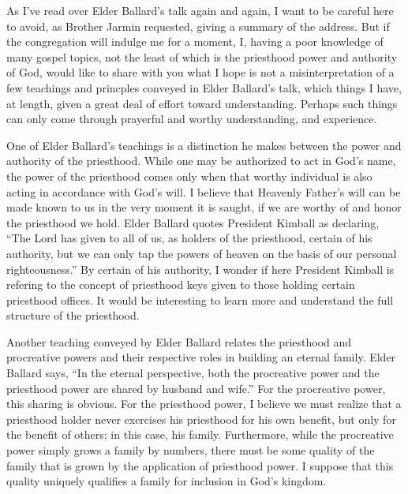 \documentclass[12pt]{article}
\begin{document}
As I've read over Elder Ballard's talk again and again, I want to be careful here to
avoid, as Brother Jarmin requested, giving a summary of the address.  But if the
congregation will indulge me for a moment, I, having a
poor knowledge of many gospel topics, not the least of which is the priesthood
power and authority of God, would like to share with you what I hope is not
a misinterpretation of a few teachings and princples conveyed in Elder Ballard's talk,
which things I have, at length, given a great deal of effort toward understanding.
Perhaps such things can only come through prayerful and worthy understanding,
and experience.

One of Elder Ballard's teachings is a distinction he makes between the power and
authority of the priesthood.  While one may be authorized to act in God's name,
the power of the priesthood comes only when that worthy individual is also acting in
accordance with God's will.  I believe that Heavenly Father's will can be made known
to us in the very moment it is saught, if we are worthy of and honor the priesthood we hold.
Elder Ballard quotes President Kimball as declaring, ``The Lord has given to all of us, as holders of
the priesthood, certain of his authority, but we can only tap the powers of heaven on the basis
of our personal righteousness.''  By certain of his authority, I wonder if here President Kimball
is refering to the concept of priesthood keys given to those holding certain priesthood offices.
It would be interesting to learn more and understand the full structure of the priesthood.

Another teaching conveyed by Elder Ballard relates the priesthood and procreative powers
and their respective roles in building an eternal family.  Elder Ballard says, ``In the
eternal perspective, both the procreative power and the priesthood power are shared by husband
and wife.''  
For the procreative power, this sharing is obvious.  For the priesthood power, I believe
we must realize that a priesthood holder never exercises his priesthood for his own benefit,
but only for the benefit of others; in this case, his family.  Furthermore, while the procreative
power simply grows a family by numbers, there must be some quality of the family that is grown
by the application of priesthood power.  I suppose that this quality uniquely qualifies a family
for inclusion in God's kingdom.

\end{document}
